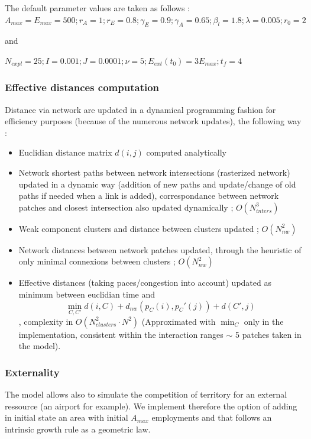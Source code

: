 The default parameter values are taken as follows : $A_{max} = E_{max} = 500 ; r_A = 1 ; r_E = 0.8 ; \gamma_E = 0.9 ; \gamma_A = 0.65 ; \beta_{l} = 1.8 ; \lambda = 0.005 ; r_0 = 2$

and 
 
$N_{expl} = 25 ; I = 0.001 ; J = 0.0001 ; \nu = 5 ; E_{ext}(t_0) = 3E_{max} ; t_f = 4$



\subsubsection{Effective distances computation}

Distance via network are updated in a dynamical programming fashion for efficiency purposes (because of the numerous network updates), the following way :

\begin{itemize}
\item Euclidian distance matrix $d(i,j)$ computed analytically
\item Network shortest paths between network intersections (rasterized network) updated in a dynamic way (addition of new paths and update/change of old paths if needed when a link is added), correspondance between network patches and closest intersection also updated dynamically ; $O(N_{inters}^3)$
\item Weak component clusters and distance between clusters updated ; $O(N_{nw}^2)$
\item Network distances between network patches updated, through the heuristic of only minimal connexions between clusters ; $O(N_{nw}^2)$
\item Effective distances (taking paces/congestion into account) updated as minimum between euclidian time and \[\min_{C,C'}{d(i,C)+d_{nw}(p_C(i),p_C'(j))+d(C',j)}\], complexity in $O(N_{clusters}^2\cdot N^2)$ (Approximated with $\min_C$ only in the implementation, consistent within the interaction ranges $\sim$ 5 patches taken in the model). 
\end{itemize}



\subsubsection{Externality}

The model allows also to simulate the competition of territory for an external ressource (an airport for example). We implement therefore the option of adding in initial state an area with initial $A_{max}$ employments and that follows an intrinsic growth rule as a geometric law. 




